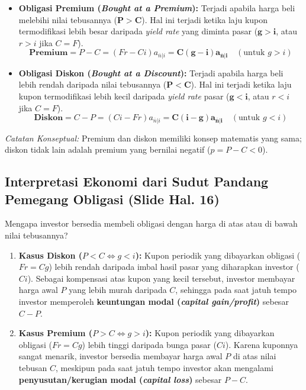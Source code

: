 \documentclass[11pt,a4paper]{article}
\begin{document}
\begin{definitionbox}
\begin{itemize}
    \item \textbf{Obligasi Premium (\textit{Bought at a Premium}):} Terjadi apabila harga beli melebihi nilai tebusannya ($\mathbf{P > C}$). Hal ini terjadi ketika laju kupon termodifikasi lebih besar daripada \textit{yield rate} yang diminta pasar ($\mathbf{g > i}$, atau $r > i$ jika $C = F$).
    \begin{equation}
        \textbf{Premium} = P - C = (Fr - Ci) a_{\overline{n}|i} = \mathbf{C(g - i) a_{\overline{n}|i}} \quad (\text{untuk } g > i)
    \end{equation}

    \item \textbf{Obligasi Diskon (\textit{Bought at a Discount}):} Terjadi apabila harga beli lebih rendah daripada nilai tebusannya ($\mathbf{P < C}$). Hal ini terjadi ketika laju kupon termodifikasi lebih kecil daripada \textit{yield rate} pasar ($\mathbf{g < i}$, atau $r < i$ jika $C = F$).
    \begin{equation}
        \textbf{Diskon} = C - P = (Ci - Fr) a_{\overline{n}|i} = \mathbf{C(i - g) a_{\overline{n}|i}} \quad (\text{untuk } g < i)
    \end{equation}
\end{itemize}
\textit{Catatan Konseptual:} Premium dan diskon memiliki konsep matematis yang sama; diskon tidak lain adalah premium yang bernilai negatif ($p = P - C < 0$).
\end{definitionbox}

\subsection{Interpretasi Ekonomi dari Sudut Pandang Pemegang Obligasi (Slide Hal. 16)}

Mengapa investor bersedia membeli obligasi dengan harga di atas atau di bawah nilai tebusannya?
\begin{enumerate}[label=\textbf{\arabic*.}]
    \item \textbf{Kasus Diskon ($P < C \iff g < i$):}
    Kupon periodik yang dibayarkan obligasi ($Fr = Cg$) lebih rendah daripada imbal hasil pasar yang diharapkan investor ($Ci$). Sebagai kompensasi atas kupon yang kecil tersebut, investor membayar harga awal $P$ yang lebih murah daripada $C$, sehingga pada saat jatuh tempo investor memperoleh \textbf{keuntungan modal (\textit{capital gain/profit})} sebesar $C - P$.
    \item \textbf{Kasus Premium ($P > C \iff g > i$):}
    Kupon periodik yang dibayarkan obligasi ($Fr = Cg$) lebih tinggi daripada bunga pasar ($Ci$). Karena kuponnya sangat menarik, investor bersedia membayar harga awal $P$ di atas nilai tebusan $C$, meskipun pada saat jatuh tempo investor akan mengalami \textbf{penyusutan/kerugian modal (\textit{capital loss})} sebesar $P - C$.
\end{enumerate}
\end{document}
